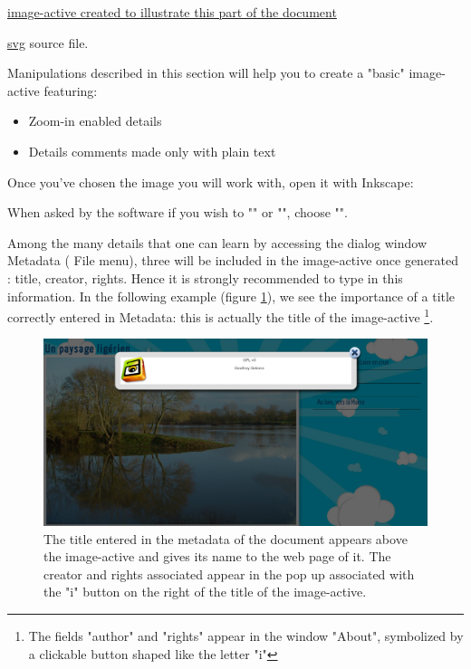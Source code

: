 \begin{links}
\href{http://images-actives.crdp-versailles.fr/beta/demo/tuto/xia1}{image-active 
created to illustrate this part of the document}

\href{http://images-actives.crdp-versailles.fr/beta/demo/tuto/xia1/svg/xia1.svg}{svg} source file.
\end{links}

Manipulations described in this section will help you to
create a "basic" image-active featuring:
\begin{itemize}
 \item Zoom-in enabled details
 \item Details comments made only with plain text
\end{itemize}


Once you've chosen the image you will work with, open it with Inkscape:


When asked by the software if you wish to "" or "", choose "".

Among the many details that one can learn by accessing the 
dialog window  Metadata (\chemin
{File} menu), three will be included in the image-active once
generated : title, creator, rights. Hence it is strongly recommended to type in this information. In the following example (figure \ref{titre_ia}),
we see the importance of a title correctly entered in
Metadata: this is actually the title of the image-active  \footnote{The
fields "author" and "rights" appear in the window
"About", symbolized by a clickable button shaped like the letter "i"}.

\begin{figure}[htp]
 \centering
 \includegraphics[width=\textwidth,clip=true,trim=0mm 120mm 55mm 0mm ]{images/titre_ia}
 \caption{The title entered in the metadata of the document appears above 
the image-active and gives its name to the web page of it. The creator and 
 rights associated appear in the pop up associated with the "i" button 
on the right of the title of the image-active.}
 \label{titre_ia}
\end{figure}

